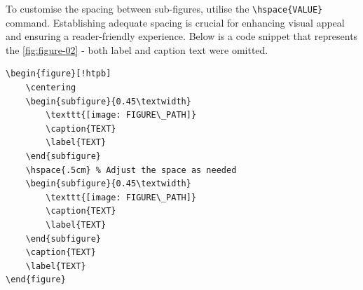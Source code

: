 To customise the spacing between sub-figures, utilise the \verb|\hspace{VALUE}| command. Establishing adequate spacing is crucial for enhancing visual appeal and ensuring a reader-friendly experience. Below is a code snippet that represents the \autoref{fig:figure-02} - both label and caption text were omitted.

\begin{verbatim}
\begin{figure}[!htpb]
    \centering
    \begin{subfigure}{0.45\textwidth}
        \texttt{[image: FIGURE\_PATH]}
        \caption{TEXT}
        \label{TEXT}
    \end{subfigure}
    \hspace{.5cm} % Adjust the space as needed
    \begin{subfigure}{0.45\textwidth}
        \texttt{[image: FIGURE\_PATH]}
        \caption{TEXT}
        \label{TEXT}
    \end{subfigure}
    \caption{TEXT}
    \label{TEXT}
\end{figure}
\end{verbatim}